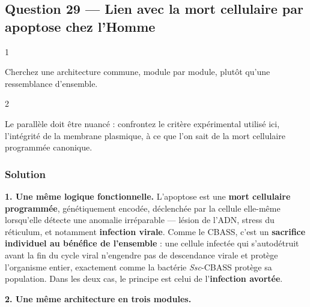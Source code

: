 \documentclass[11pt,a4paper]{article}
\begin{document}
\hypertarget{question-29-lien-avec-la-mort-cellulaire-par-apoptose-chez-lhomme}{%
\subsection{Question 29 --- Lien avec la mort cellulaire par apoptose chez l'Homme}\label{question-29-lien-avec-la-mort-cellulaire-par-apoptose-chez-lhomme}}

\begin{indication}{1}

Cherchez une architecture commune, module par module, plutôt qu'une ressemblance d'ensemble.

\end{indication}

\begin{indication}{2}

Le parallèle doit être nuancé : confrontez le critère expérimental utilisé ici, l'intégrité de la membrane plasmique, à ce que l'on sait de la mort cellulaire programmée canonique.

\end{indication}

\hypertarget{solution-28}{%
\subsubsection{Solution}\label{solution-28}}

\textbf{1. Une même logique fonctionnelle.} L'apoptose est une \textbf{mort cellulaire programmée}, génétiquement encodée, déclenchée par la cellule elle-même lorsqu'elle détecte une anomalie irréparable --- lésion de l'ADN, stress du réticulum, et notamment \textbf{infection virale}. Comme le CBASS, c'est un \textbf{sacrifice individuel au bénéfice de l'ensemble} : une cellule infectée qui s'autodétruit avant la fin du cycle viral n'engendre pas de descendance virale et protège l'organisme entier, exactement comme la bactérie \emph{Ssc}-CBASS protège sa population. Dans les deux cas, le principe est celui de l'\textbf{infection avortée}.

\textbf{2. Une même architecture en trois modules.}
\end{document}
